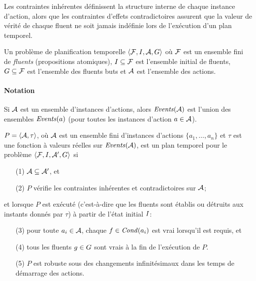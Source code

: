Les contraintes inhérentes définissent la structure interne de chaque instance d'action, alors que les contraintes d'effets contradictoires assurent que la valeur de vérité de chaque fluent ne soit jamais indéfinie lors de l'exécution d'un plan temporel. %

\begin{definition}
Un problème de planification temporelle $\langle \mathcal{F}, I, \mathcal{A}, G \rangle$ %
où $\mathcal{F}$ est un ensemble fini de \emph{fluents} (propositions atomiques), $I \subseteq \mathcal{F}$ est l'ensemble initial de fluents, $G \subseteq \mathcal{F}$ est l'ensemble des fluents buts et $\mathcal{A}$ est l'ensemble des actions.
\end{definition}
\paragraph*{Notation} Si $\mathcal{A}$ est un ensemble d'instances d'actions, alors $\mathit{Events}(\mathcal{A})$ est l'union des ensembles $\mathit{Events}(a)$ (pour toutes les instances d'action $a\in \mathcal{A}$).

\begin{definition}\label{def:plan-temporel}
$P = \langle \mathcal{A}, \tau \rangle$, où $\mathcal{A}$ est un ensemble fini d'instances d'actions $\{a_1,\ldots, a_n\}$ et $\tau$ est une fonction à valeurs réelles sur $\mathit{Events}(\mathcal{A})$, est un plan temporel pour le problème $\langle \mathcal{F}, I , \mathcal{A}^{\prime}, G \rangle$ si
\begin{enumerate}
\item[(1)] $\mathcal{A} \subseteq \mathcal{A}^{\prime}$, et
\item[(2)] $P$ vérifie les contraintes inhérentes et contradictoires sur $\mathcal{A}$;
\end{enumerate}
et lorsque $P$ est exécuté (c'est-à-dire que les fluents sont établis ou détruits aux instants donnés par $\tau$) à partir de l'état initial $I$:
\begin{enumerate}
\item[(3)] pour toute $a_i \in \mathcal{A}$, chaque $f \in \mathit{Cond}(a_i)$ est vrai lorsqu'il est requis, et
\item[(4)] tous les fluents $g \in G$ sont vrais à la fin de l'exécution de $P$.
\item[(5)] $P$ est robuste sous des changements infinitésimaux dans les temps de démarrage des actions.
\end{enumerate}
\end{definition}

